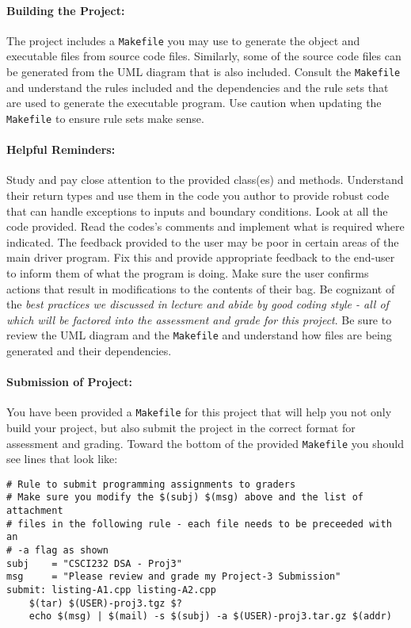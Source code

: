 \documentclass[10pt,letterpaper]{article}
\newcounter{x}\setcounter{x}{1}
\begin{document}
\paragraph{Building the Project:} The project includes a \verb|Makefile| you may use to generate the object and executable files from source code files. Similarly, some of the source code files can be generated from the UML diagram that is also included. Consult the \verb|Makefile| and understand the rules included and the dependencies and the rule sets that are used to generate the executable program. Use caution when updating the \verb|Makefile| to ensure rule sets make sense. 

\paragraph{Helpful Reminders:} Study and pay close attention to the provided class(es) and methods. Understand their return types and use them in the code you author to provide robust code that can handle exceptions to inputs and boundary conditions. Look at all the code provided. Read the codes's comments and implement what is required where indicated. The feedback provided to the user may be poor in certain areas of the main driver program. Fix this and provide appropriate feedback to the end-user to inform them of what the program is doing. Make sure the user confirms actions that result in modifications to the contents of their bag. Be cognizant of the {\em{}best practices we discussed in lecture and abide by good coding style - all of which will be factored into the assessment and grade for this project}. Be sure to review the UML diagram and the \verb|Makefile| and understand how files are being generated and their dependencies. 

\paragraph{Submission of Project:} You have been provided a \verb|Makefile| for this project that will help you not only build your project, but also submit the project in the correct format for assessment and grading. Toward the bottom of the provided \verb|Makefile| you should see lines that look like:

\begin{lstlisting}
# Rule to submit programming assignments to graders
# Make sure you modify the $(subj) $(msg) above and the list of attachment
# files in the following rule - each file needs to be preceeded with an
# -a flag as shown
subj    = "CSCI232 DSA - Proj3"
msg     = "Please review and grade my Project-3 Submission"
submit:	listing-A1.cpp listing-A2.cpp
	$(tar) $(USER)-proj3.tgz $?
	echo $(msg) | $(mail) -s $(subj) -a $(USER)-proj3.tar.gz $(addr)
\end{lstlisting}
\end{document}
